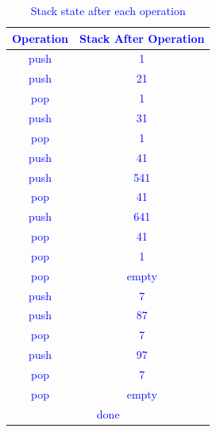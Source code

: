 \documentclass{article}
\begin{document}
\begin{enumerate}[label=(\alph*)]
    \begin{table}[h!]
    \centering
    \begin{tabular}{|c|c|}
    \hline
    \textcolor{blue}{\textbf{Operation}} & \textcolor{blue}{\textbf{Stack After Operation}} \\
    \hline
    \textcolor{blue}{push} & \textcolor{blue}{1} \\
    \textcolor{blue}{push} & \textcolor{blue}{21} \\
    \textcolor{blue}{pop} & \textcolor{blue}{1} \\
    \textcolor{blue}{push} & \textcolor{blue}{31} \\
    \textcolor{blue}{pop} & \textcolor{blue}{1} \\
    \textcolor{blue}{push} & \textcolor{blue}{41} \\
    \textcolor{blue}{push} & \textcolor{blue}{541} \\
    \textcolor{blue}{pop} & \textcolor{blue}{41} \\
    \textcolor{blue}{push} & \textcolor{blue}{641} \\
    \textcolor{blue}{pop} & \textcolor{blue}{41} \\
    \textcolor{blue}{pop} & \textcolor{blue}{1} \\
    \textcolor{blue}{pop} & \textcolor{blue}{empty} \\
    \textcolor{blue}{push} & \textcolor{blue}{7} \\
    \textcolor{blue}{push} & \textcolor{blue}{87} \\
    \textcolor{blue}{pop} & \textcolor{blue}{7} \\
    \textcolor{blue}{push} & \textcolor{blue}{97} \\
    \textcolor{blue}{pop} & \textcolor{blue}{7} \\
    \textcolor{blue}{pop} & \textcolor{blue}{empty} \\
    \hline
    \multicolumn{2}{|c|}{\textcolor{blue}{done}} \\
    \hline
    \end{tabular}
    \caption{\textcolor{blue}{Stack state after each operation}}
    \end{table}


\end{enumerate}
\end{document}
